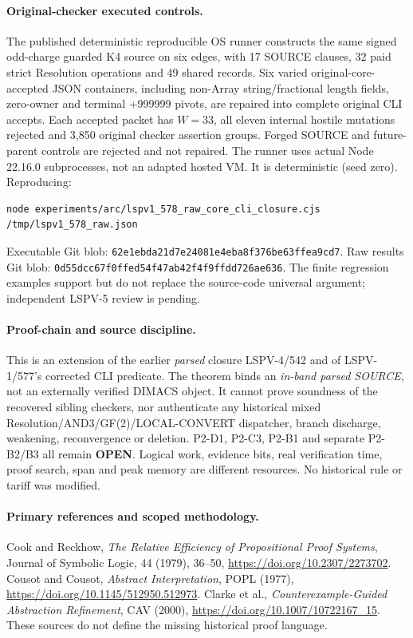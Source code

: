 \documentclass[11pt]{article}
\begin{document}
\paragraph{Original-checker executed controls.}
The published deterministic reproducible OS runner constructs
the same signed odd-charge guarded K4 source on six edges, with
17 SOURCE clauses, 32 paid strict Resolution operations and 49
shared records. Six varied original-core-accepted JSON containers,
including non-Array string/fractional length fields, zero-owner
and terminal +999999 pivots, are repaired into complete original
CLI accepts. Each accepted packet has $W=33$, all eleven
internal hostile mutations rejected and 3,850 original
checker assertion groups. Forged SOURCE and future-parent
controls are rejected and not repaired. The runner uses
actual Node 22.16.0 subprocesses, not an adapted hosted VM.
It is deterministic (seed zero). Reproducing:
\begin{verbatim}
node experiments/arc/lspv1_578_raw_core_cli_closure.cjs /tmp/lspv1_578_raw.json
\end{verbatim}
Executable Git blob:
\texttt{62e1ebda21d7e24081e4eba8f376be63ffea9cd7}.
Raw results Git blob:
\texttt{0d55dcc67f0ffed54f47ab42f4f9ffdd726ae636}.
The finite regression examples support but do not replace
the source-code universal argument; independent LSPV-5 review is pending.

\paragraph{Proof-chain and source discipline.}
This is an extension of the earlier \emph{parsed} closure
LSPV-4/542 and of LSPV-1/577's corrected CLI predicate.
The theorem binds an \emph{in-band parsed SOURCE}, not an
externally verified DIMACS object. It cannot prove soundness
of the recovered sibling checkers, nor authenticate any
historical mixed Resolution/AND3/GF(2)/LOCAL-CONVERT dispatcher,
branch discharge, weakening, reconvergence or deletion.
P2-D1, P2-C3, P2-B1 and separate P2-B2/B3 all remain
\textbf{OPEN}. Logical work, evidence bits, real verification
time, proof search, span and peak memory are different resources.
No historical rule or tariff was modified.

\paragraph{Primary references and scoped methodology.}
Cook and Reckhow, \emph{The Relative Efficiency of
Propositional Proof Systems}, Journal of Symbolic Logic,
44 (1979), 36--50,
\url{https://doi.org/10.2307/2273702}.
Cousot and Cousot, \emph{Abstract Interpretation},
POPL (1977),
\url{https://doi.org/10.1145/512950.512973}.
Clarke et al., \emph{Counterexample-Guided Abstraction
Refinement}, CAV (2000),
\url{https://doi.org/10.1007/10722167_15}.
These sources do not define the missing historical proof language.
\end{document}
